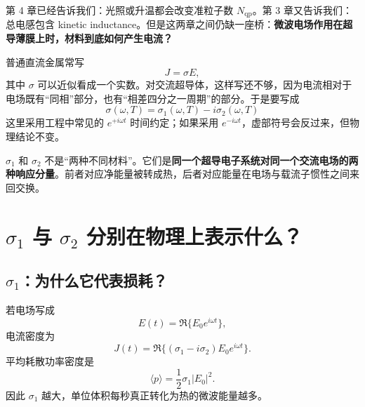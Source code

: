 \documentclass[11pt,a4paper,openany]{ctexrep}
\newcommand{\qp}{\mathrm{qp}}
\begin{document}
第 4 章已经告诉我们：光照或升温都会改变准粒子数 $N_{\qp}$。第 3 章又告诉我们：总电感包含 kinetic inductance。但是这两章之间仍缺一座桥：\textbf{微波电场作用在超导薄膜上时，材料到底如何产生电流？}

普通直流金属常写
\[
J=\sigma E,
\]
其中 $\sigma$ 可以近似看成一个实数。对交流超导体，这样写还不够，因为电流相对于电场既有“同相”部分，也有“相差四分之一周期”的部分。于是要写成
\[
\boxed{
\sigma(\omega,T)=\sigma_1(\omega,T)-i\sigma_2(\omega,T)
}
\]
这里采用工程中常见的 $e^{+i\omega t}$ 时间约定；如果采用 $e^{-i\omega t}$，虚部符号会反过来，但物理结论不变。

\begin{center}
\end{center}

\begin{intuitionbox}
$\sigma_1$ 和 $\sigma_2$ 不是“两种不同材料”。它们是\textbf{同一个超导电子系统对同一个交流电场的两种响应分量}。前者对应净能量被转成热，后者对应能量在电场与载流子惯性之间来回交换。
\end{intuitionbox}

\section{$\sigma_1$ 与 $\sigma_2$ 分别在物理上表示什么？}

\subsection{$\sigma_1$：为什么它代表损耗？}

若电场写成
\[
E(t)=\Re\{E_0e^{i\omega t}\},
\]
电流密度为
\[
J(t)=\Re\{(\sigma_1-i\sigma_2)E_0e^{i\omega t}\}.
\]
平均耗散功率密度是
\[
\boxed{
\langle p\rangle=\frac12\sigma_1|E_0|^2.
}
\]
因此 $\sigma_1$ 越大，单位体积每秒真正转化为热的微波能量越多。
\end{document}
